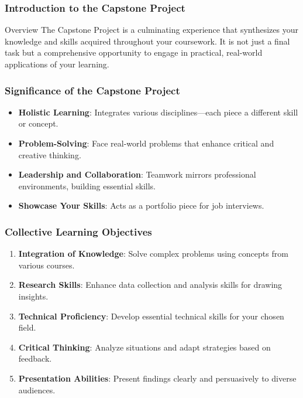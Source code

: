 \documentclass[aspectratio=169]{beamer}
\begin{document}
\frame{\titlepage}

\begin{frame}[fragile]
    \titlepage
\end{frame}

\begin{frame}[fragile]
    \frametitle{Introduction to the Capstone Project}
    \begin{block}{Overview}
      The Capstone Project is a culminating experience that synthesizes your knowledge and skills acquired throughout your coursework. 
      It is not just a final task but a comprehensive opportunity to engage in practical, real-world applications of your learning.
    \end{block}
\end{frame}

\begin{frame}[fragile]
    \frametitle{Significance of the Capstone Project}
    \begin{itemize}
        \item \textbf{Holistic Learning}: Integrates various disciplines—each piece a different skill or concept.
        \item \textbf{Problem-Solving}: Face real-world problems that enhance critical and creative thinking.
        \item \textbf{Leadership and Collaboration}: Teamwork mirrors professional environments, building essential skills.
        \item \textbf{Showcase Your Skills}: Acts as a portfolio piece for job interviews.
    \end{itemize}
\end{frame}

\begin{frame}[fragile]
    \frametitle{Collective Learning Objectives}
    \begin{enumerate}
        \item \textbf{Integration of Knowledge}: Solve complex problems using concepts from various courses.
        \item \textbf{Research Skills}: Enhance data collection and analysis skills for drawing insights.
        \item \textbf{Technical Proficiency}: Develop essential technical skills for your chosen field.
        \item \textbf{Critical Thinking}: Analyze situations and adapt strategies based on feedback.
        \item \textbf{Presentation Abilities}: Present findings clearly and persuasively to diverse audiences.
    \end{enumerate}
\end{frame}
\end{document}
